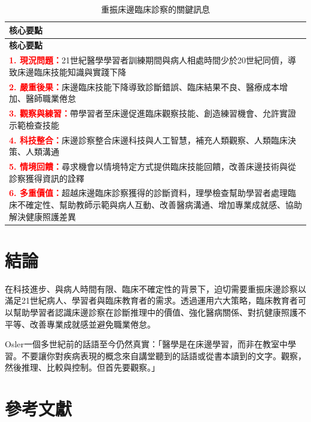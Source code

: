\documentclass[11pt,a4paper]{article}
\begin{document}
\begin{longtable}{p{14cm}}
\caption{重振床邊臨床診察的關鍵訊息} \\
\toprule
\textbf{核心要點} \\
\midrule
\endfirsthead
\textbf{核心要點} \\
\midrule
\endhead
\bottomrule
\endfoot
\endlastfoot

\textcolor{red}{\textbf{1. 現況問題：}}21世紀醫學學習者訓練期間與病人相處時間少於20世紀同儕，導致床邊臨床技能知識與實踐下降 \\
\midrule

\textcolor{red}{\textbf{2. 嚴重後果：}}床邊臨床技能下降導致診斷錯誤、臨床結果不良、醫療成本增加、醫師職業倦怠 \\
\midrule

\textcolor{red}{\textbf{3. 觀察與練習：}}帶學習者至床邊促進臨床觀察技能、創造練習機會、允許實證示範檢查技能 \\
\midrule

\textcolor{red}{\textbf{4. 科技整合：}}床邊診察整合床邊科技與人工智慧，補充人類觀察、人類臨床決策、人類溝通 \\
\midrule

\textcolor{red}{\textbf{5. 情境回饋：}}尋求機會以情境特定方式提供臨床技能回饋，改善床邊技術與從診察獲得資訊的詮釋 \\
\midrule

\textcolor{red}{\textbf{6. 多重價值：}}超越床邊臨床診察獲得的診斷資料，理學檢查幫助學習者處理臨床不確定性、幫助教師示範與病人互動、改善醫病溝通、增加專業成就感、協助解決健康照護差異 \\

\end{longtable}

\section{結論}

在科技進步、與病人時間有限、臨床不確定性的背景下，迫切需要重振床邊診察以滿足21世紀病人、學習者與臨床教育者的需求。透過運用六大策略，臨床教育者可以幫助學習者認識床邊診察在診斷推理中的價值、強化醫病關係、對抗健康照護不平等、改善專業成就感並避免職業倦怠。

Osler一個多世紀前的話語至今仍然真實：「醫學是在床邊學習，而非在教室中學習。不要讓你對疾病表現的概念來自講堂聽到的話語或從書本讀到的文字。觀察，然後推理、比較與控制。但首先要觀察。」

\section{參考文獻}
\end{document}

